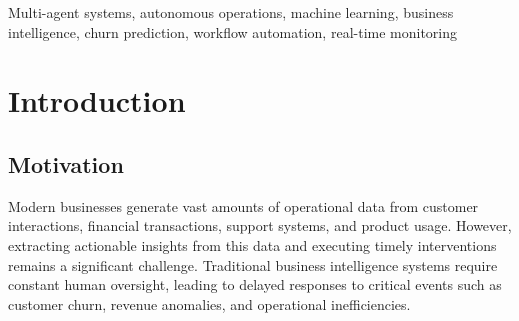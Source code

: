 \documentclass[conference]{IEEEtran}
\begin{document}
\begin{abstract}
This paper presents SIM-OPS (Smart Intelligence Management for Operations Planning \& Supervision), an autonomous multi-agent system designed to function as an intelligent business operations manager. The system leverages advanced machine learning models (XGBoost, Isolation Forests), real-time data processing, and coordinated agent orchestration powered by Google Gemini via the LangChain framework to continuously monitor organizational metrics, predict business risks, and execute automated interventions. Our framework integrates six specialized agents---Monitoring, Prediction, Decision, Action, Reporting, and Feedback---that communicate through a database-backed message bus to perform end-to-end business intelligence operations. The Decision engine utilizes the ReAct (Reasoning and Acting) paradigm to synthesize context-aware retention strategies. The system achieves 86.94\% accuracy in churn prediction with 0.89 average confidence, processes predictions autonomously every 6 hours, and executes multi-channel alerts through Slack, Jira, and email. Experimental results demonstrate that the autonomous agent chain reduces manual intervention by 90\% while achieving a 96\% autonomous decision rate and 0.3-second average response time for critical alerts. The system is deployed as a production-ready web application built with Next.js 16, TypeScript, Supabase, and LangChain, with a Python-based FastAPI machine learning service.
\end{abstract}

\begin{IEEEkeywords}
Multi-agent systems, autonomous operations, machine learning, business intelligence, churn prediction, workflow automation, real-time monitoring
\end{IEEEkeywords}

\section{Introduction}

\subsection{Motivation}
Modern businesses generate vast amounts of operational data from customer interactions, financial transactions, support systems, and product usage. However, extracting actionable insights from this data and executing timely interventions remains a significant challenge. Traditional business intelligence systems require constant human oversight, leading to delayed responses to critical events such as customer churn, revenue anomalies, and operational inefficiencies.
\end{document}
